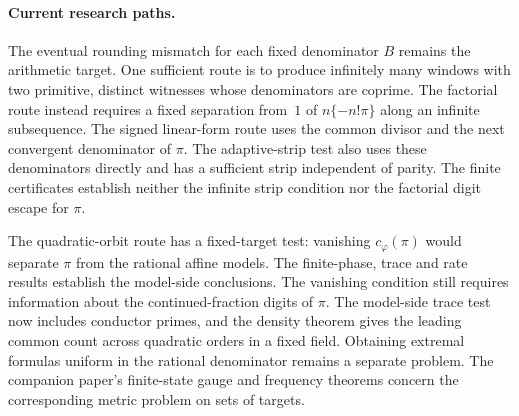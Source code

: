\documentclass[11pt]{amsart}
\theoremstyle{definition}
\theoremstyle{remark}
\numberwithin{equation}{section}
\begin{document}
\paragraph{Current research paths.}
The eventual rounding mismatch for each fixed denominator $B$ remains
the arithmetic target. One sufficient route is to produce infinitely many
windows with two primitive, distinct witnesses whose denominators are
coprime. The factorial route instead requires a fixed separation from~$1$
of $n\{-n!\pi\}$ along an infinite subsequence. The signed linear-form
route uses the common divisor and the next convergent denominator of
$\pi$. The adaptive-strip test also uses these denominators directly
and has a sufficient strip independent of parity. The finite
certificates establish neither the infinite strip condition nor the
factorial digit escape for $\pi$.

The quadratic-orbit route has a fixed-target test: vanishing
$c_\varphi(\pi)$ would separate $\pi$ from the rational affine models.
The finite-phase, trace and rate results establish the model-side
conclusions. The vanishing condition still requires information about the
continued-fraction digits of $\pi$. The model-side trace test now includes conductor primes,
and the density theorem gives the leading common count across
quadratic orders in a fixed field. Obtaining extremal formulas
uniform in the rational denominator remains a separate problem. The companion
paper's finite-state gauge and frequency theorems concern the corresponding
metric problem on sets of targets.
\end{document}
